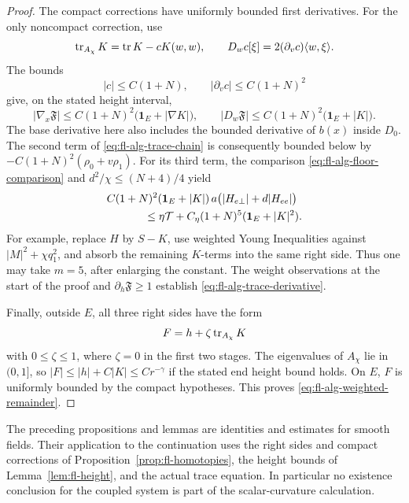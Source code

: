 \begin{proof}
The compact corrections have uniformly bounded first derivatives.
For the only noncompact correction, use
\[
 \operatorname{tr}_{A_\chi}K=\operatorname{tr} K-cK(w,w),\qquad
 D_wc[\xi]=2(\partial_vc)\langle w,\xi\rangle.
\]
The bounds
\[
 |c|\le C(1+N),\qquad
 |\partial_vc|\le C(1+N)^2
\]
give, on the stated height interval,
\[
 |\nabla_x\mathfrak F|
      \le C(1+N)^2\bigl(\mathbf 1_E+|\nabla K|\bigr),
 \qquad
 |D_w\mathfrak F|
      \le C(1+N)^2\bigl(\mathbf 1_E+|K|\bigr).
\]
The base derivative here also includes the bounded derivative of
\(b(x)\) inside \(D_0\).
The second term of \eqref{eq:fl-alg-trace-chain} is consequently
bounded below by
\(-C(1+N)^2(\rho_0+v\rho_1)\).
For its third term, the comparison
\eqref{eq:fl-alg-floor-comparison} and
\(d^2/\chi\le(N+4)/4\) yield
\[
 \begin{split}
 &C(1+N)^2(\mathbf 1_E+|K|)\,
       a\bigl(|H_{e\perp}|+d|H_{ee}|\bigr)\\
 &\hspace{12mm}\le
     \eta\mathcal T+
       C_\eta(1+N)^5(\mathbf 1_E+|K|^2).
 \end{split}
\]
For example, replace \(H\) by \(S-K\), use weighted Young Inequalities
against \(|M|^2+\chi q_1^2\), and absorb the remaining \(K\)-terms
into the same right side. Thus one may take \(m=5\), after enlarging
the constant. The weight observations at the start of the proof and
\(\partial_h\mathfrak F\ge1\) establish
\eqref{eq:fl-alg-trace-derivative}.

Finally, outside \(E\), all three right sides have the form
\[
 F=h+\zeta\operatorname{tr}_{A_\chi}K
\]
with \(0\le\zeta\le1\), where \(\zeta=0\) in the first two stages.
The eigenvalues of \(A_\chi\) lie in \((0,1]\), so
\(|F|\le |h|+C|K|\le Cr^{-\gamma}\) if the stated end height bound
holds. On \(E\), \(F\) is uniformly bounded by the compact hypotheses.
This proves \eqref{eq:fl-alg-weighted-remainder}.
\end{proof}

\begin{remark}
\label{rem:fl-alg-interfaces}
The preceding propositions and lemmas are identities and estimates
for smooth fields. Their application to the continuation uses the
right sides and compact corrections of
Proposition~\ref{prop:fl-homotopies}, the height bounds of
Lemma~\ref{lem:fl-height}, and the actual trace equation.
In particular no existence conclusion for the coupled system is
part of the scalar-curvature calculation.
\end{remark}
